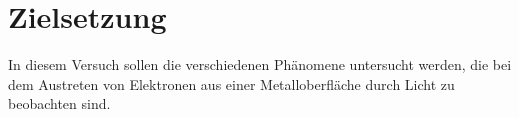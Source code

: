 \section{Zielsetzung}
\label{sec:Zielsetzung}

In diesem Versuch sollen die verschiedenen Phänomene untersucht werden, die bei dem Austreten 
von Elektronen aus einer Metalloberfläche durch Licht zu beobachten sind. \\
